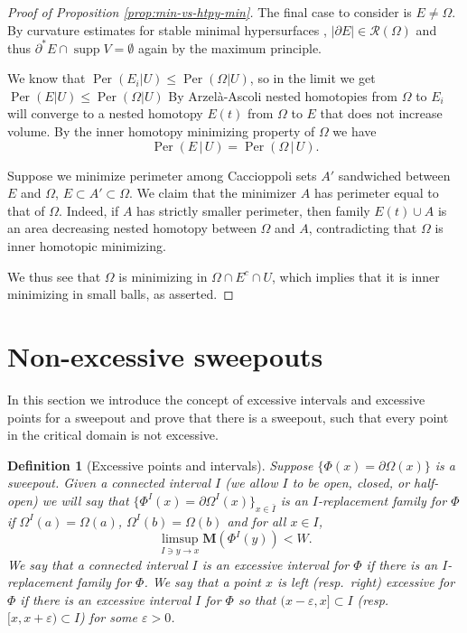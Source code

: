 \documentclass[12pt,twoside]{amsart}
\numberwithin{equation}{section}
\renewcommand{\leq}{\leqslant}
\newtheorem{definition}[theorem]{Definition}
\newcommand{\Om}{\Omega}
\renewcommand{\cR}{\mathcal R}
\newcommand{\bM}{\mathbf{M}}
\DeclareMathOperator{\Per}{Per}
\DeclareMathOperator{\supp}{supp}
\newcommand{\eps}{\varepsilon}
\begin{document}
\begin{proof}[Proof of Proposition \ref{prop:min-vs-htpy-min}]
The final case to consider is $E\neq \Omega$. By curvature estimates for stable minimal hypersurfaces \cite{SS}, $|\partial E| \in \cR(\Omega)$ and thus $\partial^*E \cap \supp V = \emptyset$ again by the maximum principle.

We know that $\Per(E_i| U) \leq \Per(\Omega| U)$, so in the limit we get
$\Per(E| U) \leq \Per(\Omega| U)$
By Arzel\`a-Ascoli nested homotopies from $\Omega$ to $E_i$ will converge to
a nested homotopy $E(t)$ from $\Omega$ to $E$ that does not increase volume.
By the inner homotopy minimizing property of $\Omega$ we have
\[
\Per(E\,|\,U) = \Per(\Omega\, |\, U).
\]

Suppose we minimize perimeter among Caccioppoli sets $A'$ sandwiched between $E$ and $\Omega$, $E \subset A' \subset \Omega$. We claim that the
minimizer $A$ has perimeter equal to that of $\Omega$. Indeed, if  $A$ has strictly
smaller perimeter, then family $E(t) \cup A$
is an area decreasing nested homotopy between $\Omega$ and $A$, contradicting that
$\Omega$ is inner homotopic minimizing.

We thus see that $\Omega$ is minimizing in $\Omega \cap E^c \cap U$, which implies that it is inner minimizing in small balls, as asserted. 
\end{proof}


\section{Non-excessive sweepouts}\label{sec:min-max}

In this section we introduce the concept of excessive intervals and excessive points for a sweepout and prove that there is a sweepout, such that every point in the critical domain is not excessive.

\begin{definition}[Excessive points and intervals] \label{def:excessive_interval}
	Suppose $\{\Phi(x)=\partial \Omega(x)\}$ is a sweepout. Given a connected interval $I$ (we allow $I$ to be open, closed, or half-open)
	we will say that $\{\Phi^I(x) = \partial \Om^I(x)\}_{x\in \bar I}$ is an \emph{$I$-replacement family for $\Phi$} if
	$\Om^I(a) = \Om(a)$, $\Om^I(b)=\Om(b)$ and for all $x \in I$, 
\[
\limsup_{I \ni y\to x} \bM(\Phi^I(y)) < W.
\]
We say that a connected interval $I$ is an \emph{excessive interval for $\Phi$} if there is an $I$-replacement family for  $\Phi$. We say that a point $x$ is \emph{left (resp.\ right) excessive for $\Phi$} if there is an excessive interval $I$ for $\Phi$ so that $(x-\eps,x]\subset I$ (resp.\ $[x,x+\eps)\subset I$) for some $\eps>0$. 
\end{definition}
\end{document}
